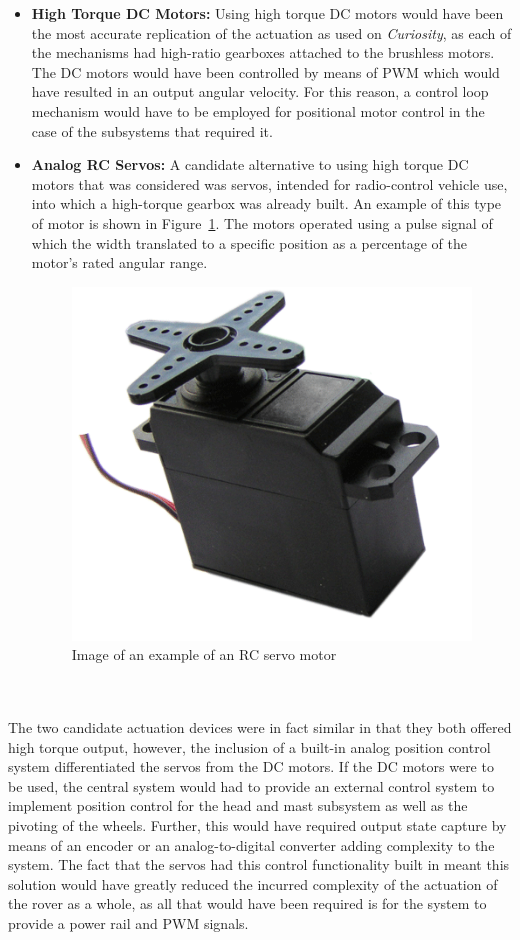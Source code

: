       \begin{itemize}
        \item \textbf{High Torque DC Motors:} Using high torque DC motors would have been the most accurate replication of the actuation as used on \textit{Curiosity}, as each of the mechanisms had high-ratio gearboxes attached to the brushless motors. The DC motors would have been controlled by means of PWM which would have resulted in an output angular velocity. For this reason, a control loop mechanism would have to be employed for positional motor control in the case of the subsystems that required it.
        \item \textbf{Analog RC Servos:} A candidate alternative to using high torque DC motors that was considered was servos, intended for radio-control vehicle use, into which a high-torque gearbox was already built. An example of this type of motor is shown in Figure~\ref{fig:concepts-servoMotorExample}. The motors operated using a pulse signal of which the width translated to a specific position as a percentage of the motor's rated angular range.
        
        \begin{figure}[H]
          \centering
          \includegraphics[width=0.3\linewidth]{figures/concepts-servoMotorExample}
          \caption[Image of an example of an RC servo motor]{Image of an example of an RC servo motor \cite{fig:concepts-servoMotorExample_cite}}
          \label{fig:concepts-servoMotorExample}
        \end{figure}

      \end{itemize}
      
      \\\\
        The two candidate actuation devices were in fact similar in that they both offered high torque output, however, the inclusion of a built-in analog position control system differentiated the servos from the DC motors. If the DC motors were to be used, the central system would had to provide an external control system to implement position control for the head and mast subsystem as well as the pivoting of the wheels. Further, this would have required output state capture by means of an encoder or an analog-to-digital converter adding complexity to the system. The fact that the servos had this control functionality built in meant this solution would have greatly reduced the incurred complexity of the actuation of the rover as a whole, as all that would have been required is for the system to provide a power rail and PWM signals.
        

